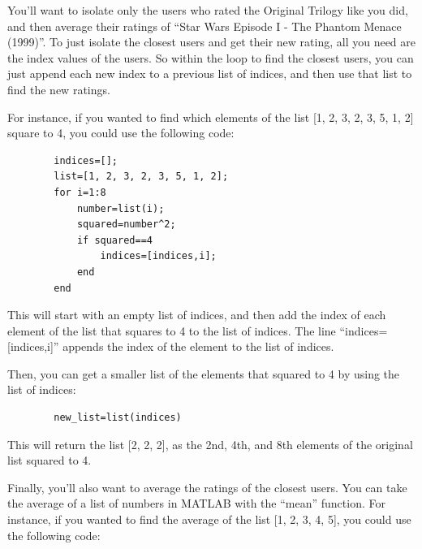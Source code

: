 \documentclass{ximera}
\begin{document}
    \begin{hint}

      You'll want to isolate only the users who rated the Original Trilogy like you did, and then average their ratings of ``Star Wars Episode I - The Phantom Menace (1999)''. To just isolate the closest users and get their new rating, all you need are the index values of the users. So within the loop to find the closest users, you can just append each new index to a previous list of indices, and then use that list to find the new ratings.

      For instance, if you wanted to find which elements of the list [1, 2, 3, 2, 3, 5, 1, 2] square to 4, you could use the following code:
      \begin{verbatim}
        indices=[];
        list=[1, 2, 3, 2, 3, 5, 1, 2];
        for i=1:8
            number=list(i);
            squared=number^2;
            if squared==4
                indices=[indices,i];
            end
        end
      \end{verbatim}
      
      This will start with an empty list of indices, and then add the index of each element of the list that squares to 4 to the list of indices. The line ``indices=[indices,i]'' appends the index of the element to the list of indices.

      Then, you can get a smaller list of the elements that squared to 4 by using the list of indices:
      \begin{verbatim}
        new_list=list(indices)
      \end{verbatim}
        


      This will return the list [2, 2, 2], as the 2nd, 4th, and 8th elements of the original list squared to 4.

      Finally, you'll also want to average the ratings of the closest users. You can take the average of a list of numbers in MATLAB with the ``mean'' function. For instance, if you wanted to find the average of the list [1, 2, 3, 4, 5], you could use the following code:


\end{hint}
\end{document}
